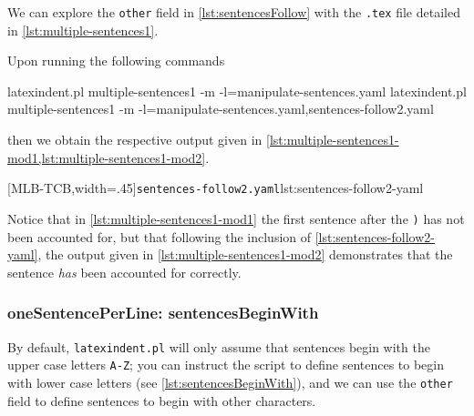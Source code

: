  \begin{example}
 We can explore the \texttt{other} field in \cref{lst:sentencesFollow} with the
 \texttt{.tex} file detailed in \cref{lst:multiple-sentences1}.


 Upon running the following commands  
 \begin{widepage}

  \begin{commandshell}
latexindent.pl multiple-sentences1 -m -l=manipulate-sentences.yaml
latexindent.pl multiple-sentences1 -m -l=manipulate-sentences.yaml,sentences-follow2.yaml
\end{commandshell}

 \end{widepage}
 then we obtain the respective output given in
 \cref{lst:multiple-sentences1-mod1,lst:multiple-sentences1-mod2}.

 \begin{cmhtcbraster}[
   raster force size=false,
   raster column 1/.style={add to width=1cm},
  ]
  [MLB-TCB,width=.45\textwidth]{\texttt{sentences-follow2.yaml}}{lst:sentences-follow2-yaml}
 \end{cmhtcbraster}

 Notice that in \cref{lst:multiple-sentences1-mod1} the first sentence after the
 \texttt{)} has not been accounted for, but that following the inclusion of
 \cref{lst:sentences-follow2-yaml}, the output given in
 \cref{lst:multiple-sentences1-mod2} demonstrates that the sentence \emph{has} been
 accounted for correctly.
 \end{example}

\subsubsection{oneSentencePerLine: sentencesBeginWith}
 By default, \texttt{latexindent.pl} will only assume that sentences begin with the upper
 case letters \texttt{A-Z}; you can instruct the script to define sentences to begin with
 lower case letters (see \cref{lst:sentencesBeginWith}), and we can use the
 \texttt{other} field to define sentences to begin with other characters.

